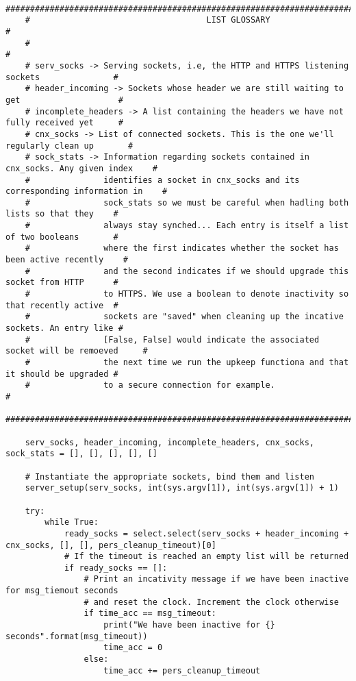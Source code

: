 \documentclass[landscape]{article}
\begin{document}
\begin{verbatim}
    ##########################################################################################
    #                                    LIST GLOSSARY                                       #
    #                                                                                        #
    # serv_socks -> Serving sockets, i.e, the HTTP and HTTPS listening sockets               #
    # header_incoming -> Sockets whose header we are still waiting to get                    #
    # incomplete_headers -> A list containing the headers we have not fully received yet     #
    # cnx_socks -> List of connected sockets. This is the one we'll regularly clean up       #
    # sock_stats -> Information regarding sockets contained in cnx_socks. Any given index    #
    #               identifies a socket in cnx_socks and its corresponding information in    #
    #               sock_stats so we must be careful when hadling both lists so that they    #
    #               always stay synched... Each entry is itself a list of two booleans       #
    #               where the first indicates whether the socket has been active recently    #
    #               and the second indicates if we should upgrade this socket from HTTP      #
    #               to HTTPS. We use a boolean to denote inactivity so that recently active  #
    #               sockets are "saved" when cleaning up the incative sockets. An entry like #
    #               [False, False] would indicate the associated socket will be remoeved     #
    #               the next time we run the upkeep functiona and that it should be upgraded #
    #               to a secure connection for example.                                      #
    ##########################################################################################

    serv_socks, header_incoming, incomplete_headers, cnx_socks, sock_stats = [], [], [], [], []

    # Instantiate the appropriate sockets, bind them and listen
    server_setup(serv_socks, int(sys.argv[1]), int(sys.argv[1]) + 1)

    try:
        while True:
            ready_socks = select.select(serv_socks + header_incoming + cnx_socks, [], [], pers_cleanup_timeout)[0]
            # If the timeout is reached an empty list will be returned
            if ready_socks == []:
                # Print an incativity message if we have been inactive for msg_tiemout seconds
                # and reset the clock. Increment the clock otherwise
                if time_acc == msg_timeout:
                    print("We have been inactive for {} seconds".format(msg_timeout))
                    time_acc = 0
                else:
                    time_acc += pers_cleanup_timeout


\end{verbatim}
\end{document}
